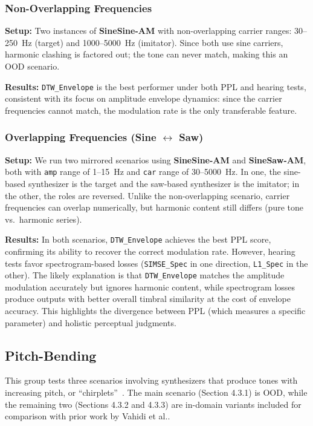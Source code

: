 \documentclass{article}
\newcommand{\SIMSESpec}{\texttt{SIMSE\_\allowbreak Spec}\xspace}
\newcommand{\LoneSpec}{\texttt{L1\_\allowbreak Spec}\xspace}
\newcommand{\DTWEnv}{\texttt{DTW\_\allowbreak Envelope}\xspace}
\newcommand{\FMMod}{\textbf{SineSaw-AM}\xspace}
\newcommand{\FMModvtwo}{\textbf{SineSine-AM}\xspace}
\begin{document}
\subsubsection{Non-Overlapping Frequencies}
\label{sec:am_sound_matching_nonoverlapping}
\textbf{Setup:} Two instances of \FMModvtwo with non-overlapping carrier ranges: 30--250~Hz (target) and 1000--5000~Hz (imitator). Since both use sine carriers, harmonic clashing is factored out; the tone can never match, making this an OOD scenario.

\noindent \textbf{Results:}
\DTWEnv is the best performer under both PPL and hearing tests, consistent with its focus on amplitude envelope dynamics: since the carrier frequencies cannot match, the modulation rate is the only transferable feature.

\subsubsection{Overlapping Frequencies (Sine $\leftrightarrow$ Saw)}
\label{sec:am_sine_saw}
\textbf{Setup:} We run two mirrored scenarios using \FMModvtwo and \FMMod, both with \texttt{amp} range of 1--15~Hz and \texttt{car} range of 30--5000~Hz. In one, the sine-based synthesizer is the target and the saw-based synthesizer is the imitator; in the other, the roles are reversed. Unlike the non-overlapping scenario, carrier frequencies can overlap numerically, but harmonic content still differs (pure tone vs.\ harmonic series).

\noindent \textbf{Results:} In both scenarios, \DTWEnv achieves the best PPL score, confirming its ability to recover the correct modulation rate. However, hearing tests favor spectrogram-based losses (\SIMSESpec in one direction, \LoneSpec in the other). The likely explanation is that \DTWEnv matches the amplitude modulation accurately but ignores harmonic content, while spectrogram losses produce outputs with better overall timbral similarity at the cost of envelope accuracy. This highlights the divergence between PPL (which measures a specific parameter) and holistic perceptual judgments.
\subsection{Pitch-Bending}
\label{sec:chirplet_scenarios}
This group tests three scenarios involving synthesizers that produce tones with increasing pitch, or ``chirplets''~\cite{mann1995chirplet,lostanlen2019shape}. The main scenario (Section 4.3.1) is OOD, while the remaining two (Sections 4.3.2 and 4.3.3) are in-domain variants included for comparison with prior work by Vahidi et al.\cite{vahidi2023mesostructures}. 
\end{document}
